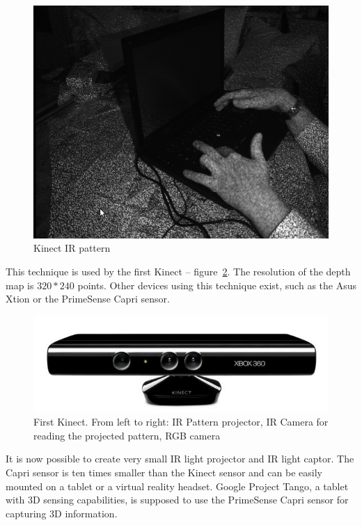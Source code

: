 \documentclass[12pt]{article}
\begin{document}
\begin{figure}[h]
  \centering
  \includegraphics[scale=0.3]{Kinect-ir-image.png}
  \caption{\label{fig:kinectir} Kinect IR pattern}
\end{figure}

This technique is used by the first Kinect -- figure~\ref{fig:kinect}. The resolution of the depth map is $320*240$ points. Other devices using this technique exist, such as the Asus Xtion or the PrimeSense Capri sensor.

\begin{figure}[h]
  \centering
  \includegraphics[scale=0.3]{kinect1.jpg}
  \caption{\label{fig:kinect} First Kinect. From left to right: IR Pattern projector, IR Camera for reading the projected pattern, RGB camera}
\end{figure}

It is now possible to create very small IR light projector and IR light captor. The Capri sensor is ten times smaller than the Kinect sensor and can be easily mounted on a tablet or a virtual reality headset. Google Project Tango, a tablet with 3D sensing capabilities, is supposed to use the PrimeSense Capri sensor for capturing 3D information.
\end{document}
